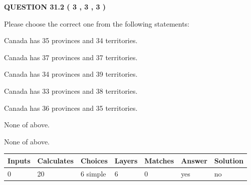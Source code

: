 \documentclass[12pt]{article}
\begin{document}
   
  
\vspace{0.2in}
  
{\textbf{\Large{QUESTION
31.2 
 (           3 ,           3 ,           3 )
}}}
  
  
Please choose the correct one from the following statements:
 
 
Canada has  %
35 provinces and  %
34 territories.
 
 
Canada has  %
37 provinces and  %
37 territories.
 
 
Canada has  %
34 provinces and  %
39 territories.
 
 
Canada has  %
33 provinces and  %
38 territories.
 
 
Canada has  %
36 provinces and  %
35 territories.
 
 
 None of above.
 
 
\noindent{}
 
 
 None of above.
 
 
\noindent{}
 
 
   
   
   
   
\noindent\begin{tabular}{|l|l|l|l|l|l|l|}
 \hline
Inputs & Calculates & Choices & Layers & Matches & Answer & Solution \\ \hline
           0  & 
          20  & 
           6
  simple  
  & 
           6  & 
           0  & 
  yes & 
  no 
  \\ \hline
 \end{tabular}
   
   
   
   
\noindent{}
   
   
  
\end{document}
